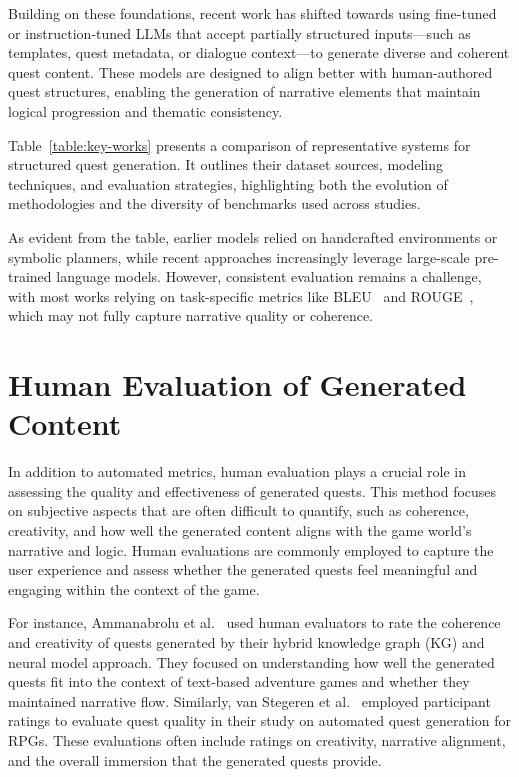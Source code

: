 Building on these foundations, recent work has shifted towards using fine-tuned or
instruction-tuned LLMs that accept partially structured inputs—such as templates, quest
metadata, or dialogue context—to generate diverse and coherent quest content. These
models are designed to align better with human-authored quest structures, enabling the
generation of narrative elements that maintain logical progression and thematic consistency.

Table~\ref{table:key-works} presents a comparison of representative systems for structured quest generation.
It outlines their dataset sources, modeling techniques, and evaluation strategies,
highlighting both the evolution of methodologies and the diversity of benchmarks used
across studies.

As evident from the table, earlier models relied on handcrafted environments or symbolic
planners, while recent approaches increasingly leverage large-scale pre-trained language
models. However, consistent evaluation remains a challenge, with most works
relying on task-specific metrics like BLEU~\cite{papineni02bleu} and ROUGE~\cite{lin2004looking}, which may not fully
capture narrative quality or coherence.

\section{Human Evaluation of Generated Content}

In addition to automated metrics, human evaluation plays a crucial role in assessing
the quality and effectiveness of generated quests. This method focuses on subjective
aspects that are often difficult to quantify, such as coherence, creativity, and how well the
generated content aligns with the game world's narrative and logic. Human evaluations
are commonly employed to capture the user experience and assess whether the generated
quests feel meaningful and engaging within the context of the game.

For instance, Ammanabrolu et al.~\cite{ammanabrolu2019toward} used human evaluators to rate the coherence
and creativity of quests generated by their hybrid knowledge graph (KG) and neural
model approach. They focused on understanding how well the generated quests fit into
the context of text-based adventure games and whether they maintained narrative flow.
Similarly, van Stegeren et al.~\cite{van2021fine} employed participant ratings to evaluate quest quality
in their study on automated quest generation for RPGs. These evaluations often include
ratings on creativity, narrative alignment, and the overall immersion that the generated
quests provide.

